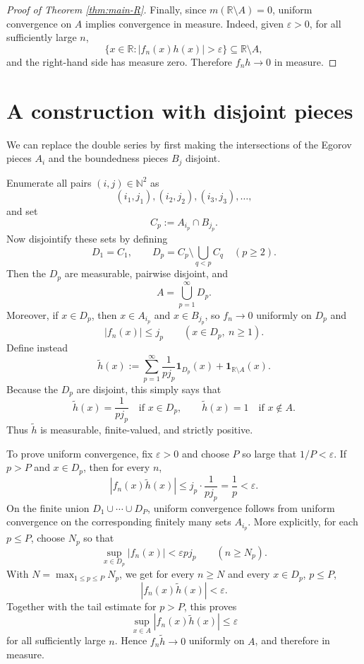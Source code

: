 \documentclass[11pt]{article}
\newcommand{\R}{\mathbb{R}}
\newcommand{\N}{\mathbb{N}}
\newcommand{\eps}{\varepsilon}
\newcommand{\one}{\mathbf 1}
\theoremstyle{plain}
\theoremstyle{definition}
\theoremstyle{remark}
\begin{document}
\begin{proof}[Proof of Theorem \ref{thm:main-R}]
Finally, since $m(\R\setminus A)=0$, uniform convergence on $A$ implies
convergence in measure.  Indeed, given $\eps>0$, for all sufficiently large
$n$,
\[
        \{x\in\R:|f_n(x)h(x)|>\eps\}
        \subseteq \R\setminus A,
\]
and the right-hand side has measure zero.  Therefore $f_nh\to 0$ in measure.
\end{proof}

\section{A construction with disjoint pieces}

We can replace the double series by first making the intersections of the Egorov pieces $A_i$
and the boundedness pieces $B_j$ disjoint.

Enumerate all pairs $(i,j)\in\N^2$ as
\[
        (i_1,j_1),(i_2,j_2),(i_3,j_3),\dots,
\]
and set
\[
        C_p:=A_{i_p}\cap B_{j_p}.
\]
Now disjointify these sets by defining
\[
        D_1=C_1,
        \qquad
        D_p=C_p\setminus \bigcup_{q<p}C_q
        \quad(p\geq 2).
\]
Then the $D_p$ are measurable, pairwise disjoint, and
\[
        A=\bigcup_{p=1}^\infty D_p.
\]
Moreover, if $x\in D_p$, then $x\in A_{i_p}$ and $x\in B_{j_p}$, so
$f_n\to 0$ uniformly on $D_p$ and
\[
        |f_n(x)|\leq j_p
        \qquad (x\in D_p,\ n\geq 1).
\]
Define instead
\[
        \widetilde h(x)
        :=
        \sum_{p=1}^\infty \frac{1}{p j_p}\one_{D_p}(x)
        +\one_{\R\setminus A}(x).
\]
Because the $D_p$ are disjoint, this simply says that
\[
        \widetilde h(x)=\frac{1}{p j_p}\quad\text{if }x\in D_p,
        \qquad
        \widetilde h(x)=1\quad\text{if }x\notin A.
\]
Thus $\widetilde h$ is measurable, finite-valued, and strictly positive.

To prove uniform convergence, fix
$\eps>0$ and choose $P$ so large that $1/P<\eps$.  If $p>P$ and $x\in D_p$,
then for every $n$,
\[
        |f_n(x)\widetilde h(x)|
        \leq j_p\cdot \frac{1}{p j_p}
        =\frac{1}{p}
        <\eps.
\]
On the finite union $D_1\cup\cdots\cup D_P$, uniform convergence follows from
uniform convergence on the corresponding finitely many sets $A_{i_p}$.  More
explicitly, for each $p\leq P$, choose $N_p$ so that
\[
        \sup_{x\in D_p}|f_n(x)|<\eps p j_p
        \qquad(n\geq N_p).
\]
With $N=\max_{1\leq p\leq P}N_p$, we get for every $n\geq N$ and every
$x\in D_p$, $p\leq P$,
\[
        |f_n(x)\widetilde h(x)|
        <\eps.
\]
Together with the tail estimate for $p>P$, this proves
\[
        \sup_{x\in A}|f_n(x)\widetilde h(x)|\leq \eps
\]
for all sufficiently large $n$.  Hence $f_n\widetilde h\to 0$ uniformly on
$A$, and therefore in measure.
\end{document}
